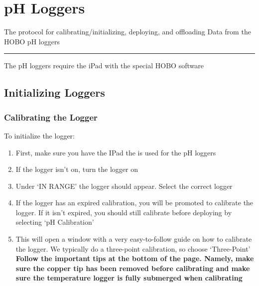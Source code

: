 \documentclass[
  letterpaper,
  DIV=11,
  numbers=noendperiod]{scrreprt}
\begin{document}
\hypertarget{ph-loggers}{%
\chapter{pH Loggers}\label{ph-loggers}}

The protocol for calibrating/initializing, deploying, and offloading
Data from the HOBO pH loggers

\begin{center}\rule{0.5\linewidth}{0.5pt}\end{center}

The pH loggers require the iPad with the special HOBO software

\hypertarget{initializing-loggers-1}{%
\section*{\texorpdfstring{\textbf{Initializing
Loggers}}{Initializing Loggers}}\label{initializing-loggers-1}}

\hypertarget{calibrating-the-logger}{%
\subsection*{\texorpdfstring{\textbf{Calibrating the
Logger}}{Calibrating the Logger}}\label{calibrating-the-logger}}

To initialize the logger:

\begin{enumerate}
\def\labelenumi{\arabic{enumi}.}
\item
  First, make sure you have the IPad the is used for the pH loggers
\item
  If the logger isn't on, turn the logger on
\item
  Under `IN RANGE' the logger should appear. Select the correct logger
\item
  If the logger has an expired calibration, you will be promoted to
  calibrate the logger. If it isn't expired, you should still calibrate
  before deploying by selecting `pH Calibration'
\item
  This will open a window with a very easy-to-follow guide on how to
  calibrate the logger. We typically do a three-point calibration, so
  choose `Three-Point' \textbf{Follow the important tips at the bottom
  of the page. Namely, make sure the copper tip has been removed before
  calibrating and make sure the temperature logger is fully submerged
  when calibrating}
\end{enumerate}
\end{document}
